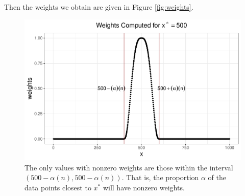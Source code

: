 \documentclass[12pt,twoside]{smiththesis}
\begin{document}
Then the weights we obtain are given in Figure \ref{fig:weights}.
\begin{figure}

{\centering \includegraphics[width=1\linewidth]{thesis_files/figure-latex/unnamed-chunk-31-1} 

}

\caption{\label{fig:weights} The only values with nonzero weights are those within the interval $(500 - \alpha (n), 500 - \alpha (n))$. That is, the proportion $\alpha$ of the data points closest to $x^*$ will have nonzero weights.}\label{fig:unnamed-chunk-31}
\end{figure}
\newpage
\end{document}
